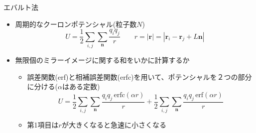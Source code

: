 
\begin{frame}[t,fragile]{エバルト法}
  \begin{itemize}
  \item 周期的なクーロンポテンシャル(粒子数$N$)
    \[
    U = \frac{1}{2} \sum_{i,j} \sum_{\mathbf{n}} \frac{q_i q_j}{r} \qquad r = |\mathbf{r}| = |\mathbf{r}_i - \mathbf{r}_j + L \mathbf{n}|
    \]
  \item 無限個のミラーイメージに関する和をいかに計算するか
    \begin{itemize}
    \item 誤差関数(erf)と相補誤差関数(erfc)を用いて、ポテンシャルを２つの部分に分ける($\alpha$はある定数)
      \[
      U = \frac{1}{2} \sum_{i,j} \sum_{\mathbf{n}} \frac{q_i q_j \, \mathrm{erfc}(\alpha r)}{r} + \frac{1}{2} \sum_{i,j} \sum_{\mathbf{n}} \frac{q_i q_j \, \mathrm{erf}(\alpha r)}{r}
      \]
    \item 第1項目は$r$が大きくなると急速に小さくなる
    \end{itemize}
  \end{itemize}
\end{frame}
